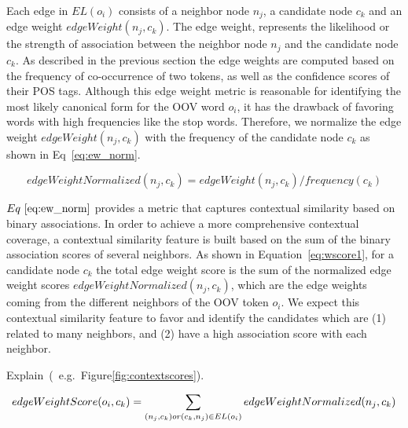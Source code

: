 \documentclass[a4paper,onesided,12pt]{report}
\begin{document}
Each edge in $EL(o_i)$ consists of a neighbor node $n_j$, a candidate node $c_k$ and an edge weight $edgeWeight(n_j,c_k)$. The edge weight, represents the likelihood or the strength of association between the neighbor node $n_j$ and the candidate node $c_k$. As described in the previous section the edge weights are computed based on the frequency of co-occurrence of two tokens, as well as the confidence scores of their POS tags.
Although this edge weight metric is reasonable for identifying the most likely canonical form for the OOV word $o_i$, it has the drawback of favoring words with high frequencies like the stop words. Therefore, we normalize the edge weight $edgeWeight(n_j,c_k)$ with the frequency of the candidate node $c_k$ as shown in Eq~\ref{eq:ew_norm}.

\begin{equation}
edgeWeightNormalized(n_j,c_k) = edgeWeight(n_j,c_k) / frequency(c_k)
\label{eq:ew_norm}
\end{equation}

$Eq~\ref{eq:ew_norm}$ provides a metric that captures contextual similarity based on binary associations.
In order to achieve a more comprehensive contextual coverage, a contextual similarity feature is built based on the sum of the binary association scores of several neighbors. As shown in Equation~\ref{eq:wscore1}, for a candidate node $c_k$ the total edge weight score is the sum of the normalized edge weight scores $edgeWeightNormalized(n_j,c_k)$, which are the edge weights coming from the different neighbors of the OOV token $o_i$. We expect this contextual similarity feature to favor and identify the candidates which are (1) related to many neighbors, and (2) have a high association score with each neighbor.

Explain~(~e.g.~Figure\ref{fig:contextscores}).

\begin{equation}
edgeWeightScore(o_i,c_k) = \sum_{(n_j,c_k) or (c_k,n_j) \in EL(o_i)}{edgeWeightNormalized(n_j,c_k)} \\\\
\label{eq:wscore1}
\end{equation}
\end{document}
